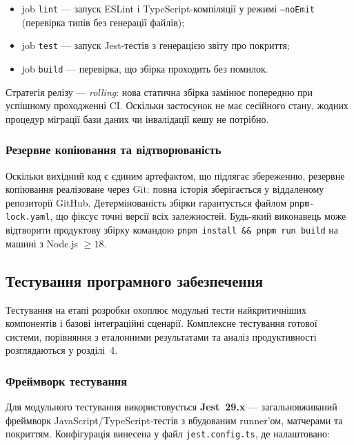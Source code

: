 \begin{itemize}
  \item job \texttt{lint} --- запуск ESLint і TypeScript-компіляції
        у режимі \texttt{--noEmit} (перевірка типів без генерації
        файлів);
  \item job \texttt{test} --- запуск Jest-тестів з генерацією звіту
        про покриття;
  \item job \texttt{build} --- перевірка, що збірка проходить без
        помилок.
\end{itemize}

Стратегія релізу --- \textit{rolling}: нова статична збірка замінює
попередню при успішному проходженні CI. Оскільки застосунок не має
сесійного стану, жодних процедур міграції бази даних чи інвалідації
кешу не потрібно.

\subsubsection*{Резервне копіювання та відтворюваність}

Оскільки вихідний код є єдиним артефактом, що підлягає збереженню,
резервне копіювання реалізоване через Git: повна історія зберігається
у віддаленому репозиторії GitHub. Детермінованість збірки гарантується
файлом \texttt{pnpm-lock.yaml}, що фіксує точні версії всіх
залежностей. Будь-який виконавець може відтворити продуктову збірку
командою \texttt{pnpm install \&\& pnpm run build} на машині з
Node.js $\ge 18$.


\subsection{Тестування програмного забезпечення}

Тестування на етапі розробки охоплює модульні тести найкритичніших
компонентів і базові інтеграційні сценарії. Комплексне тестування
готової системи, порівняння з еталонними результатами та аналіз
продуктивності розглядаються у розділі~4.

\subsubsection*{Фреймворк тестування}

Для модульного тестування використовується \textbf{Jest~29.x} ---
загальновживаний фреймворк JavaScript/TypeScript-тестів з
вбудованим runner'ом, матчерами та покриттям. Конфігурація
винесена у файл \texttt{jest.config.ts}, де налаштовано:

